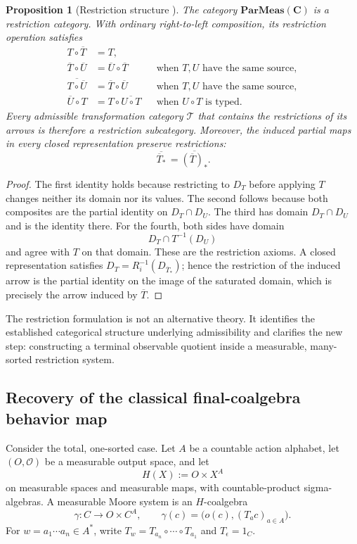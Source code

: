\documentclass[11pt]{article}
\newtheorem{proposition}[definition]{Proposition}
\begin{document}
{\begin{proposition}[Restriction structure \cite{cockettlack2002}]\label{prop:restriction}
The category $\mathbf{ParMeas}(\mathbf C)$ is a restriction category. With ordinary right-to-left composition, its restriction operation satisfies
\begin{align*}
T\circ\overline T&=T,\\
\overline T\circ\overline U&=\overline U\circ\overline T
   &&\text{when $T,U$ have the same source},\\
\overline{T\circ\overline U}&=\overline T\circ\overline U
   &&\text{when $T,U$ have the same source},\\
\overline U\circ T&=T\circ\overline{U\circ T}
   &&\text{when $U\circ T$ is typed}.
\end{align*}
Every admissible transformation category $\mathcal T$ that contains the restrictions of its arrows is therefore a restriction subcategory. Moreover, the induced partial maps in every closed representation preserve restrictions:
\[
 \overline{\,\overline T_*\,}=\overline{(\overline T)_*}.
\]
\end{proposition}

\begin{proof}
The first identity holds because restricting to $D_T$ before applying $T$ changes neither its domain nor its values. The second follows because both composites are the partial identity on $D_T\cap D_U$. The third has domain $D_T\cap D_U$ and is the identity there. For the fourth, both sides have domain
\[
D_T\cap T^{-1}(D_U)
\]
and agree with $T$ on that domain. These are the restriction axioms. A closed representation satisfies $D_T=R_i^{-1}(D_{\overline T_*})$; hence the restriction of the induced arrow is the partial identity on the image of the saturated domain, which is precisely the arrow induced by $\overline T$.
\end{proof}

The restriction formulation is not an alternative theory. It identifies the established categorical structure underlying admissibility and clarifies the new step: constructing a terminal observable quotient inside a measurable, many-sorted restriction system.

\subsection{Recovery of the classical final-coalgebra behavior map}

Consider the total, one-sorted case. Let $A$ be a countable action alphabet, let $(O,\mathcal O)$ be a measurable output space, and let
\[
H(X):=O\times X^A
\]
on measurable spaces and measurable maps, with countable-product sigma-algebras. A measurable Moore system is an $H$-coalgebra
\[
\gamma:C\longrightarrow O\times C^A,
\qquad
\gamma(c)=\bigl(o(c),(T_a c)_{a\in A}\bigr).
\]
For $w=a_1\cdots a_n\in A^*$, write $T_w=T_{a_n}\circ\cdots\circ T_{a_1}$ and $T_\epsilon=1_C$.

}
\end{document}
